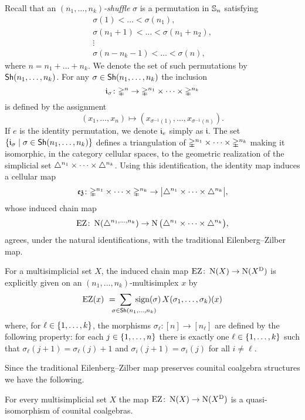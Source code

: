 Recall that an \textit{$(n_1,\dots,n_k)$-shuffle} $\sigma$ is a permutation in $\sym_n$ satisfying
\begin{gather*}
	\sigma(1) < \dots < \sigma(n_1), \\
	\sigma(n_1+1) < \dots < \sigma(n_1+n_2), \\
	\vdots \\
	\sigma(n-n_k-1) < \dots < \sigma(n),
\end{gather*}
where $n = n_1+\dots+n_k$.
We denote the set of such permutations by $\Sh(n_1,\dots,n_k)$.
For any $\sigma \in \Sh(n_1,\dots,n_k)$ the inclusion
\[
\gi_\sigma \colon \gsimplex^n \to \gmsimplex{n_1}{n_k}
\]
is defined by the assignment
\[
(x_1,\dots,x_n) \mapsto (x_{\sigma^{-1}(1)}, \dots, x_{\sigma^{-1}(n)}).
\]
If $e$ is the identity permutation, we denote $\gi_{e}$ simply as $\mathfrak{i}$.
The set $\set{\gi_\sigma \mid \sigma \in \Sh(n_1,\dots,n_k)}$ defines a triangulation of $\gmsimplex{n_1}{n_k}$ making it isomorphic, in the category cellular spaces, to the geometric realization of the simplicial set $\msimplex{n_1}{n_k}$.
Using this identification, the identity map induces a cellular map
\[
\ez \colon \gmsimplex{n_1}{n_k} \to \bars[\big]{\msimplex{n_1}{n_k}},
\]
whose induced chain map
\[
\EZ \colon \chains(\simplex^{n_1,\dots,n_k}) \to \chains\big(\msimplex{n_1}{n_k}\big),
\]
agrees, under the natural identifications, with the traditional Eilenberg--Zilber map.

For a multisimplicial set $X$, the induced chain map $\EZ \colon \chains(X) \to \chains(X^\diag)$ is explicitly given on an $(n_1,\dots,n_k)$-multisimplex $x$ by
\[
\EZ(x) \ = \sum_{\qquad \crampedclap{\sigma \in \Sh(n_1,\dots,n_k)}} \sign(\sigma) \, X(\sigma_1 ,\dots, \sigma_k)(x)
\]
where, for $\ell \in \set{1,\dots,k}$, the morphisms $\sigma_\ell \colon [n] \to [n_\ell]$ are defined by the following property: for
each $j \in \set{1,\dots,n}$ there is exactly one $\ell \in \set{1,\dots,k}$ such that $\sigma_\ell(j+1) = \sigma_\ell(j)+1$ and $\sigma_i(j+1) = \sigma_i(j)$ for all $i \neq \ell$.


Since the traditional Eilenberg--Zilber map preserves counital coalgebra structures we have the following.

\begin{theorem}
	For every multisimplicial set $X$ the map $\EZ \colon \chains(X) \to \chains(X^\diag)$ is a quasi-isomorphism of counital coalgebras.
\end{theorem}

